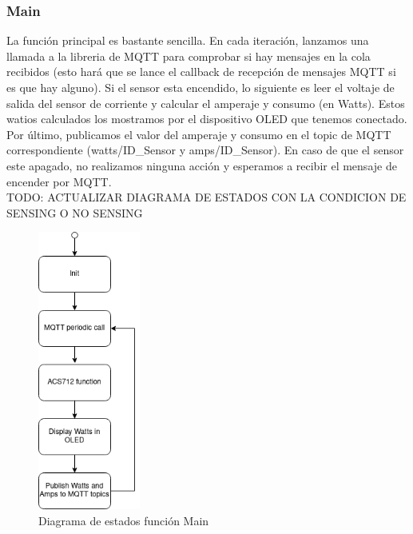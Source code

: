 \begin{titlepage}
\subsubsection{Main}
La función principal es bastante sencilla. En cada iteración, lanzamos una llamada a la libreria de MQTT para comprobar si hay mensajes en la cola recibidos (esto hará que se lance el callback de recepción de mensajes MQTT si es que hay alguno). Si el sensor esta encendido, lo siguiente es leer el voltaje de salida del sensor de corriente y calcular el amperaje y consumo (en Watts). Estos watios calculados los mostramos por el dispositivo OLED que tenemos conectado. Por último, publicamos el valor del amperaje y consumo en el topic de MQTT correspondiente (watts/ID\_Sensor y amps/ID\_Sensor). En caso de que el sensor este apagado, no realizamos ninguna acción y esperamos a recibir el mensaje de encender por MQTT.\\


TODO: ACTUALIZAR DIAGRAMA DE ESTADOS CON LA CONDICION DE SENSING O NO SENSING

\begin{figure}[h!]
	\centering
	\includegraphics[width=0.30\textwidth]{imagenes/main.drawio.png}
	\caption{Diagrama de estados función Main}
\end{figure}
\newpage

\end{titlepage}
